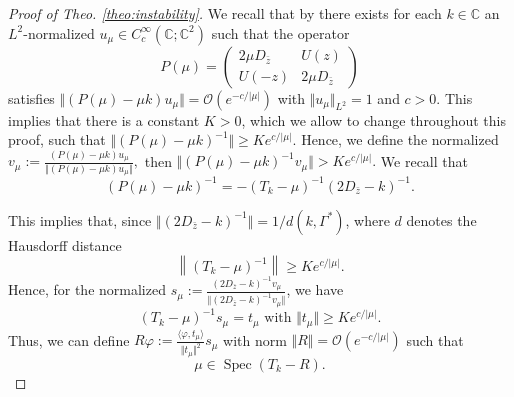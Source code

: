 \documentclass[reqno,12pt,letterpaper]{amsart}
\newcommand{\CC}{{\mathbb C}}
\numberwithin{equation}{section}
\DeclareMathOperator{\Spec}{Spec}
\begin{document}
\begin{proof}[Proof of Theo. \ref{theo:instability}]
We recall that by \cite[Theo $4$]{beta} there exists for each $k \in \mathbb C$ an $L^2$-normalized $u_\mu \in C_c^{\infty}(\CC;\CC^2)$ such that the operator 
\[ P(\mu) = \begin{pmatrix} 2\mu D_{\bar z} &U(z) \\ U(-z) & 2 \mu D_{\bar z}\end{pmatrix} \] 
satisfies $\Vert (P(\mu)-\mu k)u_\mu \Vert  = \mathcal O(e^{-c/\vert \mu \vert})$ with  $\Vert u_{\mu} \Vert_{L^2} = 1$ and $c>0.$
This implies that there is a constant $K>0$, which we allow to change throughout this proof, such that $\Vert (P(\mu)-\mu k)^{-1}\Vert  \ge K e^{c/\vert \mu \vert}.$
Hence, we define the normalized $v_{\mu}:=\frac{ (P(\mu)-\mu k)u_{\mu} }{\Vert  (P(\mu)-\mu k)u_{\mu}  \Vert},$ then $\Vert (P(\mu)-\mu k)^{-1}v_{\mu}\Vert  > K e^{c/\vert \mu \vert}.$ We recall that 
\[ (P(\mu)-\mu k)^{-1} = -(T_{k}-\mu)^{-1} (2D_{\bar z}- k)^{-1}.\]

This implies that, since $\Vert (2D_{\bar z}- k)^{-1} \Vert = 1/d(k,\Gamma^*)$, where $d$ denotes the Hausdorff distance
\[\left\lVert (T_{k}-\mu)^{-1} \right\rVert \ge K e^{c/\vert \mu \vert}.\]
Hence, for the normalized $s_\mu:=\frac{(2D_{\bar z}- k)^{-1}v_\mu}{\Vert (2D_{\bar z}- k)^{-1}v_\mu\Vert}$, we have 
$$ (T_{k}-\mu)^{-1} s_\mu  =t_\mu\text{ with }\Vert t_\mu\Vert \ge K e^{c/\vert \mu\vert}.$$
Thus, we can define $R\varphi:=\frac{\langle \varphi,t_{\mu}\rangle}{\Vert t_{\mu}\Vert^2} s_{\mu}$ with norm $\Vert R \Vert =  \mathcal O(e^{-c/\vert \mu \vert})$
such that $$\mu \in \Spec(T_{k} - R).$$
\end{proof}
\end{document}
